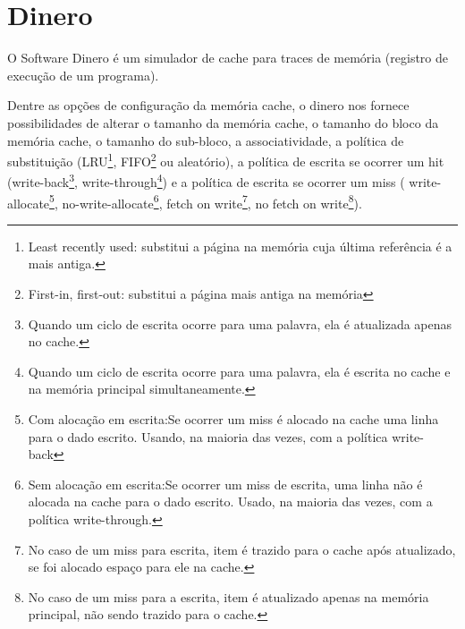 \documentclass[12pt,a4paper]{article}
\begin{document}

\section{Dinero}


O Software Dinero é um simulador de cache para traces de memória
(registro de execução de um programa).

Dentre as opções de configuração da memória cache, o dinero nos
fornece possibilidades de alterar o
tamanho da memória cache, o tamanho do bloco da memória
cache, o tamanho do sub-bloco, a associatividade, a política de
substituição (LRU\footnote{Least recently used: substitui a página na memória cuja última referência é a mais antiga.
}, FIFO\footnote{First-in, first-out: substitui a página mais antiga
  na memória} ou aleatório), a política de escrita se ocorrer um hit (write-back\footnote{Quando um ciclo de escrita ocorre para uma palavra, ela é atualizada
apenas no cache.}, write-through\footnote{Quando um ciclo de escrita ocorre para uma palavra, ela é escrita
no cache e na memória principal simultaneamente.}) e a política de escrita se ocorrer um
miss ( write-allocate\footnote{Com
  alocação em escrita:Se ocorrer um miss é alocado na cache
  uma linha para o dado escrito. Usando, na maioria das vezes, com a política write-back}, no-write-allocate\footnote{Sem
  alocação em escrita:Se ocorrer um miss de
  escrita, uma linha não é alocada na cache para o dado escrito. Usado, na maioria das vezes, com a política write-through.}, fetch on write\footnote{No caso de um miss para escrita, item é trazido
  para o cache após atualizado, se foi alocado espaço para ele na cache.}, no fetch on write\footnote{No caso de um miss para a  escrita, item é
  atualizado apenas na memória principal, não sendo trazido para o cache.}).
\end{document}
